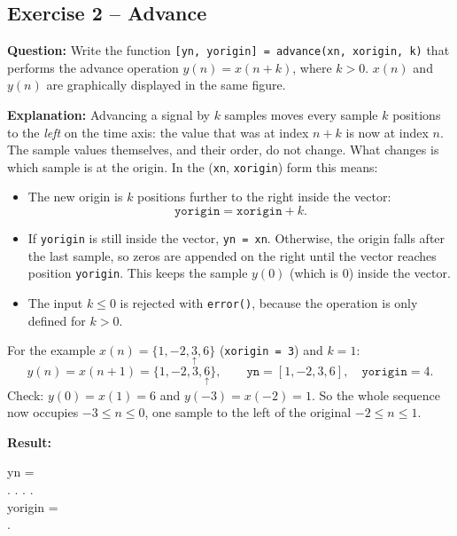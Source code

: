 \documentclass[12pt,a4paper]{article}
\newcommand{\org}[1]{\underset{\uparrow}{#1}}
\begin{document}
\subsection{Exercise 2 -- Advance}\label{sec:ex2}
\textbf{Question:} Write the function \texttt{[yn, yorigin] = advance(xn, xorigin, k)} that performs the advance operation $y(n) = x(n+k)$, where $k > 0$. $x(n)$ and $y(n)$ are graphically displayed in the same figure.

\textbf{Explanation:}
Advancing a signal by $k$ samples moves every sample $k$ positions to the \emph{left} on the time axis: the value that was at index $n+k$ is now at index $n$. The sample values themselves, and their order, do not change. What changes is which sample is at the origin. In the (\texttt{xn}, \texttt{xorigin}) form this means:
\begin{itemize}
    \item The new origin is $k$ positions further to the right inside the vector:
    \begin{equation}
        \texttt{yorigin} = \texttt{xorigin} + k .
    \end{equation}
    \item If \texttt{yorigin} is still inside the vector, \texttt{yn = xn}. Otherwise, the origin falls after the last sample, so zeros are appended on the right until the vector reaches position \texttt{yorigin}. This keeps the sample $y(0)$ (which is $0$) inside the vector.
    \item The input $k \le 0$ is rejected with \texttt{error()}, because the operation is only defined for $k>0$.
\end{itemize}
For the example $x(n) = \{1, -2, \org{3}, 6\}$ (\texttt{xorigin = 3}) and $k = 1$:
\begin{equation}
    y(n) = x(n+1) = \{1, -2, 3, \org{6}\}, \qquad \texttt{yn} = [1, -2, 3, 6], \quad \texttt{yorigin} = 4 .
\end{equation}
Check: $y(0) = x(1) = 6$ and $y(-3) = x(-2) = 1$. So the whole sequence now occupies $-3 \le n \le 0$, one sample to the left of the original $-2 \le n \le 1$.


\textbf{Result:}
\begin{consoleoutput}
yn = \\
. . . .\\
yorigin = \\
.
\end{consoleoutput}
\end{document}
